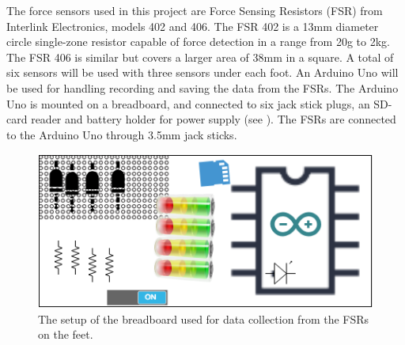 The force sensors used in this project are Force Sensing Resistors (FSR) from Interlink Electronics, models 402 and 406. The FSR 402 is a 13mm diameter circle single-zone resistor capable of force detection in a range from 20g to 2kg. The FSR 406 is similar but covers a larger area of 38mm in a square. \cite{IE400} A total of six sensors will be used with three sensors under each foot. 
An Arduino Uno will be used for handling recording and saving the data from the FSRs. The Arduino Uno is mounted on a breadboard, and connected to six jack stick plugs, an SD-card reader and battery holder for power supply (see ). The FSRs are connected to the Arduino Uno through 3.5mm jack sticks. 

\begin{figure}[H]
	\includegraphics[width=.6\textwidth]{figures/breadboardSetup}
	\caption{The setup of the breadboard used for data collection from the FSRs on the feet.}
	\label{fig:circuitBoardSetup}  %
\end{figure}





